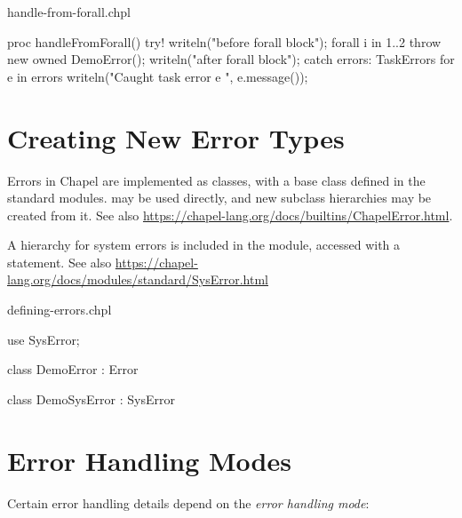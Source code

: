 \begin{chapelexample}{handle-from-forall.chpl}
\begin{chapel}
proc handleFromForall() {
  try! {
    writeln("before forall block");
    forall i in 1..2 {
      throw new owned DemoError();
    }
    writeln("after forall block");
  } catch errors: TaskErrors {
    for e in errors {
      writeln("Caught task error e ", e.message());
    }
  }
}
\end{chapel}
\begin{chapelpost}
\end{chapelpost}
\begin{chapeloutput}
\end{chapeloutput}
\end{chapelexample}


\section{Creating New Error Types}
\label{Creating_New_Error_Types}

Errors in Chapel are implemented as classes, with a base class 
defined in the standard modules.  may be used directly, and new
subclass hierarchies may be created from it.  See also
\url{https://chapel-lang.org/docs/builtins/ChapelError.html}.

A hierarchy for system errors is included in the  module,
accessed with a  statement.  See also
\url{https://chapel-lang.org/docs/modules/standard/SysError.html}

\begin{chapelexample}{defining-errors.chpl}
\begin{chapel}
use SysError;

class DemoError : Error { }

class DemoSysError : SysError { }
\end{chapel}
\begin{chapelpost}
\end{chapelpost}
\begin{chapeloutput}
\end{chapeloutput}
\end{chapelexample}


\section{Error Handling Modes}
\label{Error_Handling_Modes}

Certain error handling details depend on the \emph{error handling mode}:

